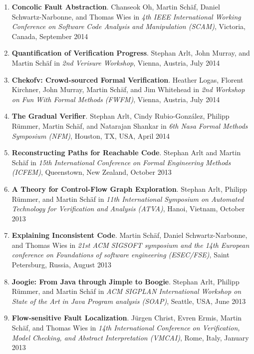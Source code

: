 \begin{enumerate}
\item \textbf{Concolic Fault Abstraction}.  
Chanseok Oh, Martin Sch\"af, Daniel Schwartz-Narbonne, and Thomas Wies in
\emph{4th IEEE International Working Conference on Software Code Analysis and
Manipulation (SCAM)}, Victoria, Canada, September 2014

\item \textbf{Quantification of Verification Progress}.
Stephan Arlt, John Murray, and Martin Sch\"af in \emph{2nd Verisure Workshop},
Vienna, Austria, July 2014


\item \textbf{Chekofv: Crowd-sourced Formal Verification}.
Heather Logas, Florent Kirchner, John Murray, Martin Sch\"af, and Jim Whitehead
in \emph{2nd Workshop on Fun With Formal Methods (FWFM)}, Vienna, Austria, July
2014


\item \textbf{The Gradual Verifier}.
Stephan Arlt, Cindy Rubio-Gonz\'alez, Philipp R\"ummer,
Martin Sch\"af, and Natarajan Shankar in \emph{6th Nasa Formal Methods
Symposium (NFM)}, Houston, TX, USA, April 2014


\item \textbf{Reconstructing Paths for Reachable Code}.
Stephan Arlt and  Martin Sch\"af in \emph{15th International Conference on
Formal Engineering Methods (ICFEM)}, Queenstown, New Zealand, October 2013


\item \textbf{A Theory for Control-Flow Graph Exploration}.
Stephan Arlt, Philipp R\"ummer, and  Martin Sch\"af in \emph{11th International
Symposium on Automated Technology for Verification and Analysis (ATVA)},
Hanoi, Vietnam, October 2013

\item \textbf{Explaining Inconsistent Code}.  
Martin Sch\"af, Daniel Schwartz-Narbonne, and Thomas Wies in \emph{21st ACM
SIGSOFT symposium and the 14th European conference on Foundations of software
engineering (ESEC/FSE)}, Saint Petersburg, Russia, August 2013


\item \textbf{Joogie: From Java through Jimple to Boogie}. Stephan
Arlt, Philipp R\"ummer, and  Martin Sch\"af  in \emph{ ACM SIGPLAN International Workshop 
on State of the Art in Java Program analysis (SOAP)}, Seattle, USA, June 2013


\item \textbf{Flow-sensitive Fault Localization}.  J\"urgen Christ, Evren Ermis, Martin Sch\"af, 
and Thomas Wies in \emph{14th International Conference on Verification, Model Checking, and 
Abstract Interpretation (VMCAI)}, Rome, Italy, January 2013


\end{enumerate}
